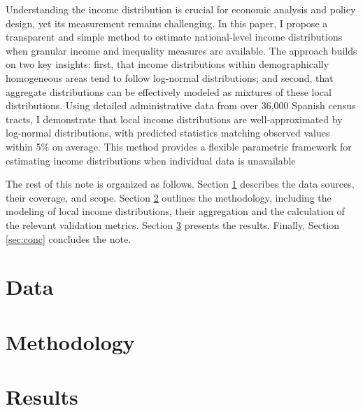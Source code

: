 \documentclass[letterpaper,11pt,leqno]{article}
\begin{document}
Understanding the income distribution is crucial for economic analysis and policy design, yet its measurement remains challenging. In this paper, I propose a transparent and simple method to estimate national-level income distributions when granular income and inequality measures are available. The approach builds on two key insights: first, that income distributions within demographically homogeneous areas tend to follow log-normal distributions; and second, that aggregate distributions can be effectively modeled as mixtures of these local distributions. Using detailed administrative data from over 36,000 Spanish census tracts, I demonstrate that local income distributions are well-approximated by log-normal distributions, with predicted statistics matching observed values within 5\% on average. This method provides a flexible parametric framework for estimating income distributions when individual data is unavailable


The rest of this note is organized as follows. Section \ref{sec:data} describes the data sources, their coverage, and scope. Section \ref{sec:method} outlines the methodology, including the modeling of local income distributions, their aggregation and the calculation of the relevant validation metrics. Section \ref{sec:results} presents the results. Finally, Section \ref{sec:conc} concludes the note.

\section{Data}\label{sec:data}



\section{Methodology}\label{sec:method}



\section{Results}\label{sec:results}
\end{document}
